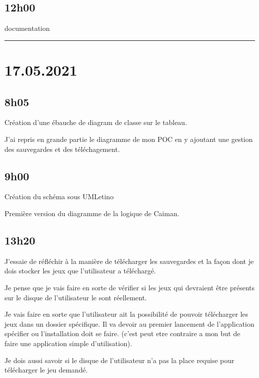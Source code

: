 \documentclass[a4paper,12pt,french]{sphinxmanual}
\begin{document}
\subsection{12h00}
\label{\detokenize{logbook:id117}}
\sphinxAtStartPar
documentation


\bigskip\hrule\bigskip



\section{17.05.2021}
\label{\detokenize{logbook:id118}}

\subsection{8h05}
\label{\detokenize{logbook:id119}}
\sphinxAtStartPar
Création d’une ébauche de diagram de classe sur le tableau.

\sphinxAtStartPar
J’ai repris en grande partie le diagramme de mon POC en y ajoutant une gestion des sauvegardes et des téléchagement.


\subsection{9h00}
\label{\detokenize{logbook:id120}}
\sphinxAtStartPar
Création du schéma sous UMLetino

\sphinxAtStartPar
Première version du diagramme de la logique de Caiman.


\subsection{13h20}
\label{\detokenize{logbook:id121}}
\sphinxAtStartPar
J’essaie de réfléchir à la manière de télécharger les sauvegardes et la façon dont je dois stocker les jeux que l’utilisateur a téléchargé.

\sphinxAtStartPar
Je pense que je vais faire en sorte de vérifier si les jeux qui devraient être présents sur le disque de l’utilisateur le sont réellement.

\sphinxAtStartPar
Je vais faire en sorte que l’utilisateur ait la possibilité de pouvoir télécharger les jeux dans un dossier spécifique. Il va devoir au premier lancement de l’application spécifier ou l’installation doit se faire. (c’est peut etre contraire a mon but de faire une application simple d’utilisation).

\sphinxAtStartPar
Je dois aussi savoir si le disque de l’utilisateur n’a pas la place requise pour télécharger le jeu demandé.
\end{document}
